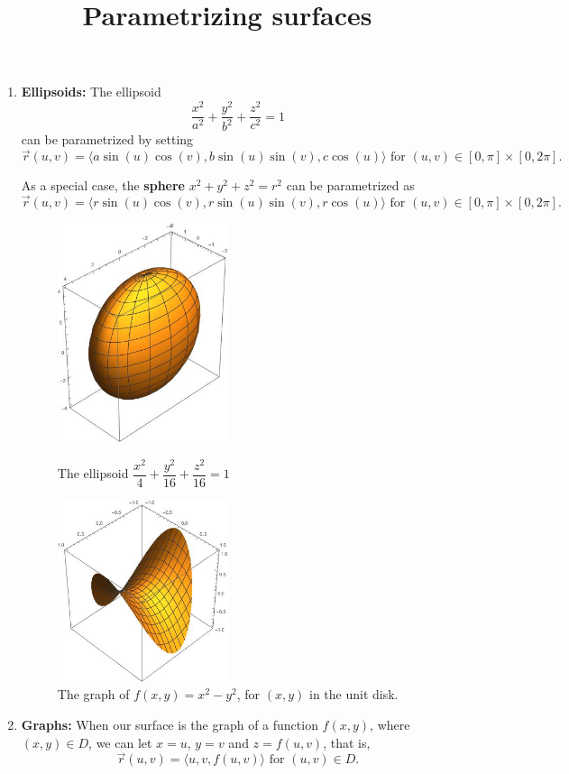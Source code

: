 \documentclass[12pt]{article}
\title{Parametrizing surfaces}
\newcommand{\vr}{\vec{r}{}}
\renewcommand{\lg}{\langle}
\newcommand{\rg}{\rangle}
\begin{document}
\maketitle
\begin{enumerate}
\item \textbf{Ellipsoids:} The ellipsoid $$\dfrac{x^2}{a^2}+\dfrac{y^2}{b^2}+\dfrac{z^2}{c^2}=1$$ can be parametrized by setting $$\vr(u,v)=\lg a\sin(u)\cos(v),b\sin(u)\sin(v),c\cos(u)\rg \text{ for }(u,v)\in [0,\pi]\times[0,2\pi].$$

As a special case, the \textbf{sphere} $x^2+y^2+z^2=r^2$ can be parametrized as $$\vr(u,v)=\lg r\sin(u)\cos(v),r\sin(u)\sin(v),r\cos(u)\rg \text{ for }(u,v)\in [0,\pi]\times[0,2\pi].$$

\begin{figure}[h]
\centering
\parbox{5cm}{
\includegraphics[width=5cm]{ellipsoid.jpeg}
\caption{The ellipsoid  $\dfrac{x^2}{4}+\dfrac{y^2}{16}+\dfrac{z^2}{16}=1$}
\label{}}
\qquad
\begin{minipage}{5cm}
\includegraphics[width=5cm]{saddle.jpeg}
\caption{The graph of $f(x,y)=x^2-y^2$, for $(x,y)$ in the unit disk.}
\label{fig:2figsB}
\end{minipage}
\end{figure}



\item \textbf{Graphs:} When our surface is the graph of a function $f(x,y)$, where $(x,y)\in D$, we can let $x=u$, $y=v$  and $z=f(u,v)$, that is, $$\vr(u,v)=\lg u,v, f(u,v)\rg\text{ for }(u,v)\in D.$$



\end{enumerate}
\end{document}
